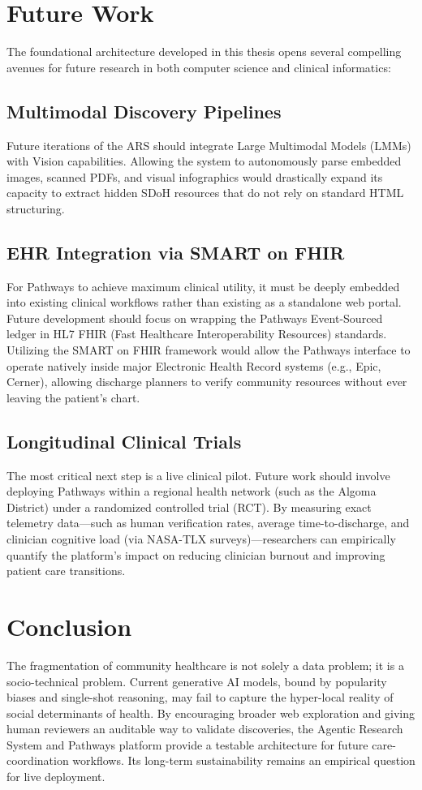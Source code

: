 \documentclass[12pt,oneside]{report}
\begin{document}
\section{Future Work}
The foundational architecture developed in this thesis opens several compelling avenues for future research in both computer science and clinical informatics:

\subsection{Multimodal Discovery Pipelines}
Future iterations of the ARS should integrate Large Multimodal Models (LMMs) with Vision capabilities. Allowing the system to autonomously parse embedded images, scanned PDFs, and visual infographics would drastically expand its capacity to extract hidden SDoH resources that do not rely on standard HTML structuring. 

\subsection{EHR Integration via SMART on FHIR}
For Pathways to achieve maximum clinical utility, it must be deeply embedded into existing clinical workflows rather than existing as a standalone web portal. Future development should focus on wrapping the Pathways Event-Sourced ledger in HL7 FHIR (Fast Healthcare Interoperability Resources) standards. Utilizing the SMART on FHIR framework would allow the Pathways interface to operate natively inside major Electronic Health Record systems (e.g., Epic, Cerner), allowing discharge planners to verify community resources without ever leaving the patient's chart.

\subsection{Longitudinal Clinical Trials}
The most critical next step is a live clinical pilot. Future work should involve deploying Pathways within a regional health network (such as the Algoma District) under a randomized controlled trial (RCT). By measuring exact telemetry data—such as human verification rates, average time-to-discharge, and clinician cognitive load (via NASA-TLX surveys)—researchers can empirically quantify the platform's impact on reducing clinician burnout and improving patient care transitions.

\section{Conclusion}
The fragmentation of community healthcare is not solely a data problem; it is a socio-technical problem. Current generative AI models, bound by popularity biases and single-shot reasoning, may fail to capture the hyper-local reality of social determinants of health. By encouraging broader web exploration and giving human reviewers an auditable way to validate discoveries, the Agentic Research System and Pathways platform provide a testable architecture for future care-coordination workflows. Its long-term sustainability remains an empirical question for live deployment.
\end{document}
